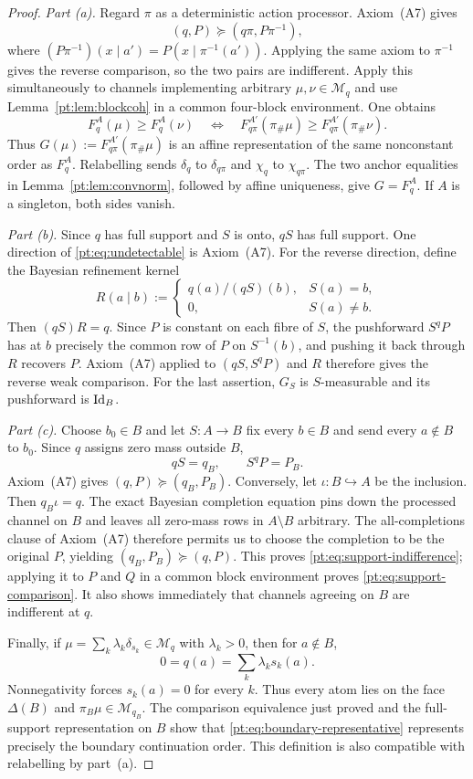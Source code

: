 \begin{proof}
\emph{Part (a).}
Regard $\pi$ as a deterministic action processor.  Axiom~\textup{(A7)}
gives
\[
 (q,P)\succeq(q\pi,P\pi^{-1}),
\]
where $(P\pi^{-1})(x\mid a')=P(x\mid\pi^{-1}(a'))$.  Applying the same axiom
to $\pi^{-1}$ gives the reverse comparison, so the two pairs are indifferent.
Apply this simultaneously to channels implementing arbitrary
$\mu,\nu\in\mathcal M_q$ and use Lemma~\ref{pt:lem:blockcoh} in a common
four-block environment.  One obtains
\[
 F_q^A(\mu)\ge F_q^A(\nu)
 \quad\Longleftrightarrow\quad
 F_{q\pi}^{A'}(\pi_\#\mu)
 \ge F_{q\pi}^{A'}(\pi_\#\nu).
\]
Thus $G(\mu):=F_{q\pi}^{A'}(\pi_\#\mu)$ is an affine representation of the
same nonconstant order as $F_q^A$.  Relabelling sends
$\delta_q$ to $\delta_{q\pi}$ and $\chi_q$ to $\chi_{q\pi}$.  The two anchor
equalities in Lemma~\ref{pt:lem:convnorm}, followed by affine uniqueness, give
$G=F_q^A$.  If $A$ is a singleton, both sides vanish.

\emph{Part (b).}
Since $q$ has full support and $S$ is onto, $qS$ has full support.  One
direction of \eqref{pt:eq:undetectable} is Axiom~\textup{(A7)}.  For the
reverse direction, define the Bayesian refinement kernel
\[
 R(a\mid b):=
 \begin{cases}
 q(a)/(qS)(b),&S(a)=b,\\
 0,&S(a)\ne b.
 \end{cases}
\]
Then $(qS)R=q$.  Since $P$ is constant on each fibre of $S$, the pushforward
$S^qP$ has at $b$ precisely the common row of $P$ on $S^{-1}(b)$, and pushing
it back through $R$ recovers $P$.  Axiom~\textup{(A7)} applied to
$(qS,S^qP)$ and $R$ therefore gives the reverse weak comparison.  For the
last assertion, $G_S$ is $S$-measurable and its pushforward is $\operatorname{Id}_B$.

\emph{Part (c).}
Choose $b_0\in B$ and let $S:A\to B$ fix every $b\in B$ and send every
$a\notin B$ to $b_0$.  Since $q$ assigns zero mass outside $B$,
\[
 qS=q_B,
 \qquad
 S^qP=P_B.
\]
Axiom~\textup{(A7)} gives $(q,P)\succeq(q_B,P_B)$.  Conversely, let
$\iota:B\hookrightarrow A$ be the inclusion.  Then $q_B\iota=q$.  The exact
Bayesian completion equation pins down the processed channel on $B$ and leaves
all zero-mass rows in $A\setminus B$ arbitrary.  The all-completions clause of
Axiom~\textup{(A7)} therefore permits us to choose the completion to be the
original $P$, yielding $(q_B,P_B)\succeq(q,P)$.  This proves
\eqref{pt:eq:support-indifference}; applying it to $P$ and $Q$ in a common
block environment proves \eqref{pt:eq:support-comparison}.  It also shows
immediately that channels agreeing on $B$ are indifferent at $q$.

Finally, if $\mu=\sum_k\lambda_k\delta_{s_k}\in\mathcal M_q$ with
$\lambda_k>0$, then for $a\notin B$,
\[
 0=q(a)=\sum_k\lambda_ks_k(a).
\]
Nonnegativity forces $s_k(a)=0$ for every $k$.  Thus every atom lies on the
face $\Delta(B)$ and $\pi_B\mu\in\mathcal M_{q_B}$.  The comparison
equivalence just proved and the full-support representation on $B$ show that
\eqref{pt:eq:boundary-representative} represents precisely the boundary
continuation order.  This definition is also compatible with relabelling by
part~(a).
\end{proof}

